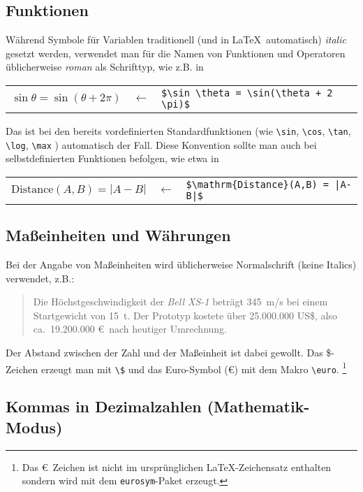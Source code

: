 \subsection{Funktionen}

Während Symbole für Variablen traditionell (und in LaTeX\ automatisch) \emph{italic} gesetzt werden, verwendet man für die Namen von Funktionen und Operatoren üblicherweise
\emph{roman} als Schrifttyp, wie z.B. in
\begin{center}
\begin{tabular}{lcl}
	$\sin \theta = \sin(\theta + 2 \pi)$ & 
	$\leftarrow$ & \verb!$\sin \theta = \sin(\theta + 2 \pi)$! \\
	\end{tabular}
\end{center}
Das ist bei den bereits vordefinierten Standardfunktionen (wie
\verb!\sin!,
\verb!\cos!,
\verb!\tan!,
\verb!\log!,
\verb!\max!
) automatisch der Fall.
Diese Konvention sollte man auch bei selbstdefinierten Funktionen befolgen,
wie etwa in
\begin{center}
	\begin{tabular}{lcl}
	$\mathrm{Distance}(A,B) = |A-B|$ & $\leftarrow$ & \verb!$\mathrm{Distance}(A,B) = |A-B|$! \\
	\end{tabular}
\end{center}


\subsection{Maßeinheiten und Währungen}

Bei der Angabe von Maßeinheiten wird üblicherweise Normalschrift
(keine Italics) verwendet, z.B.:
\begin{quote}
Die Höchstgeschwindigkeit der \textit{Bell XS-1} beträgt 345~m/s
bei einem Startgewicht von 15~t. 
Der Prototyp kostete über 25.000.000 US\$, also ca.\ 19.200.000 \euro\ nach heutiger Umrechnung.
\end{quote}
Der Abstand zwischen der Zahl und der Maßeinheit ist dabei
gewollt.
Das \$-Zeichen erzeugt man mit \verb!\$! und
das Euro-Symbol (\euro) mit dem Makro \verb!\euro!.%
\footnote{Das \euro\ Zeichen ist nicht im ursprünglichen LaTeX-Zeichensatz enthalten
sondern wird mit dem \texttt{eurosym}-Paket erzeugt.}


\subsection{Kommas in Dezimalzahlen (Mathematik-Modus)}


